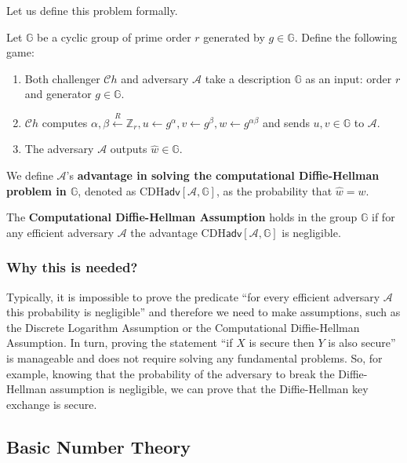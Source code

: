 \documentclass[../lecture-notes.tex]{subfiles}
\begin{document}
Let us define this problem formally.

\begin{definition}
    Let $\mathbb{G}$ be a cyclic group of prime order $r$ generated by $g \in \mathbb{G}$. Define the following game:
    \begin{enumerate}
        \item Both challenger $\mathcal{C}h$ and adversary $\mathcal{A}$ take a description $\mathbb{G}$ as an input: order $r$ and generator $g \in \mathbb{G}$.
        \item $\mathcal{C}h$ computes $\alpha, \beta \xleftarrow{R} \mathbb{Z}_r, u \gets g^{\alpha}, v \gets g^{\beta}, w \gets g^{\alpha\beta}$ and sends $u,v \in \mathbb{G}$ to $\mathcal{A}$.
        \item The adversary $\mathcal{A}$ outputs $\hat{w} \in \mathbb{G}$.
    \end{enumerate}

    We define $\mathcal{A}$'s \textbf{advantage in solving the computational Diffie-Hellman problem in $\mathbb{G}$}, denoted as $\text{CDH}\mathsf{adv}[\mathcal{A},\mathbb{G}]$, as the probability that $\hat{w} = w$.
\end{definition}

\begin{definition}
    The \textbf{Computational Diffie-Hellman Assumption} holds in the group $\mathbb{G}$ if for any efficient adversary $\mathcal{A}$ the advantage $\text{CDH}\mathsf{adv}[\mathcal{A},\mathbb{G}]$ is negligible.
\end{definition}

\subsubsection{Why this is needed?}

Typically, it is impossible to prove the predicate ``for every efficient adversary $\mathcal{A}$ this probability is negligible'' and therefore we need to make assumptions, such as the Discrete Logarithm Assumption or the Computational Diffie-Hellman Assumption. In turn, proving the statement ``if $X$ is secure then $Y$ is also secure'' is manageable and does not require solving any fundamental problems. So, for example,
knowing that the probability of the adversary to break the Diffie-Hellman assumption is negligible, we can prove that the Diffie-Hellman key exchange is secure. 

\subsection{Basic Number Theory}
\end{document}
